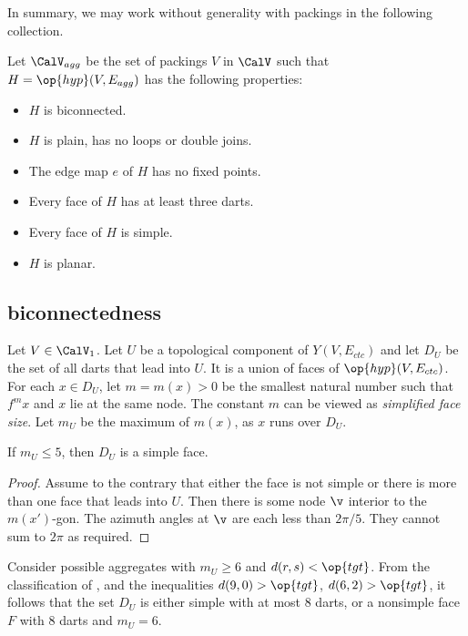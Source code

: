 In summary, we may work without generality with packings in the following collection.

\begin{definition}[$\CalV_1$]
  Let $\CalV_{agg}$ be the set of packings $V$ in $\CalV$ such that
  $H=\op{hyp}(V,E_{agg})$ has the following properties:
\begin{itemize}
\item $H$ is  biconnected.
\item $H$ is plain, has no loops or double joins.
\item The edge map $e$ of $H$ has no fixed points.
\item Every face of $H$ has at least three darts.
\item Every face of $H$ is simple.
\item $H$ is planar.
\end{itemize}
\end{definition}



\subsection{biconnectedness}

Let $V\in \CalV_1$.  Let $U$ be a topological component of
$Y(V,E_{ctc})$ and let $D_U$ be the set of all darts that lead into
$U$.  It is a union of faces of $\op{hyp}(V,E_{ctc})$.  For each $x\in
D_U$, let $m = m(x) >0$ be the smallest natural number such that $f^m
x$ and $x$ lie at the same node.  The constant $m$ can be viewed as
{\it simplified face size}.  Let $m_U$ be the maximum of $m(x)$, as
$x$ runs over $D_U$.  %
%

\begin{lemma}[]\label{lemma:DU} If $m_U\le 5$, then 
$D_U$ is a simple face.
\end{lemma}
%

\begin{proof} Assume to the contrary that either the face is not
  simple or there is more than one face that leads into $U$.  Then
  there is some node $\v$ interior to the $m(x')$-gon.  The azimuth
  angles at $\v$ are each less than $2\pi/5$. They cannot sum to $2\pi$
  as required.
\end{proof}

Consider possible aggregates with $m_U\ge 6$ and $d(r,s)<\op{tgt}$.
From the classification of \cite[p.~126,~Fig.~12.1]{Hales:2006:DCG},
and the inequalities $d(9,0) > \op{tgt}$, $d(6,2) > \op{tgt}$, it
follows that the set $D_U$ is either simple with at most $8$ darts, or
a nonsimple face $F$ with $8$ darts and $m_U=6$.


